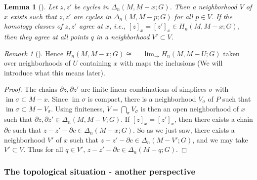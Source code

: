 \documentclass[reqno]{amsart}
\newtheorem{lemma}[theorem]{Lemma}
\theoremstyle{definition}
\theoremstyle{remark}
\newtheorem*{remark}{Remark}
\DeclareMathOperator{\im}{im}
\begin{document}
\begin{lemma}[]\label{Lemma:XHJBIQ}
    Let $z, z'$ be cycles in $\Delta_n (M , M - x; G)$. Then
    a neighborhood $V$ of $x$ exists such that
    $z,z'$ are cycles in $\Delta_n \left( M, M - p; G \right) $ for 
    all $p \in V$. If the homology classes
    of $z,z'$ agree at $x$, i.e., $\left[ z \right]_x = 
    \left[ z' \right]_x \in H_n (M, M - x;G)$, then
    they agree at all points $q$ in a neighborhood
    $V' \subset V$.
\end{lemma}

\begin{remark}[]
    Hence $H_n (M, M-x;G) \cong = \lim_{\rightarrow}
    H_n (M, M- U;G)$ taken over neighborhoods
    of $U$ containing $x$ with maps the inclusions (We will
    introduce what this means later).
\end{remark}

\begin{proof}
    The chains $\partial z, \partial z'$ are finite linear
    combinations of simplices $\sigma$ with
    $\im \sigma \subset M - x$. Since 
    $\im \sigma$ is compact, there
    is a neighborhood $V_{\sigma}$ of $P$ such that
    $\im \sigma \subset M - V_{\sigma}$. Using finiteness, 
    $V = \bigcap_{\sigma} V_{\sigma}$ is then an open
    neighborhood of $x$ such that
    $\partial z, \partial z' \in \Delta_n \left( M, M-V;G \right) $.
    If $\left[ z \right]_x = \left[ z' \right]_x$, then
    there exists a chain $\partial c$ such that
    $z -z' - \partial c \in 
    \Delta_n \left( M - x;G \right) $.
    So as we just saw, there
    exists a neighborhood $V'$ of $x$ such that
    $z-z'- \partial c \in \Delta_n \left( M-V';G \right) $, and we
    may take $V' \subset V$.
    Thus for all $q \in V'$,
    $z-z'- \partial c \in \Delta_n (M-q;G)$.
\end{proof}

\subsubsection{The topological situation - another perspective}
\end{document}
